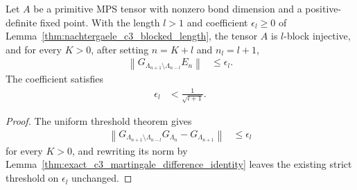 \begin{lemma}
    \label{thm:literal_open_chain_martingale_c3}
    \leanok
    Let $A$ be a primitive MPS tensor with nonzero bond dimension and a
    positive-definite fixed point.  With the length $l>1$ and coefficient
    $\epsilon_l\geq0$ of Lemma~\ref{thm:nachtergaele_c3_blocked_length}, the
    tensor $A$ is $l$-block injective, and for every $K>0$, after setting
    $n=K+l$ and $n_l=l+1$,
    \begin{align}
        \left\lVert
        G_{\Lambda_{n+1}\setminus\Lambda_{n-l}}E_n
        \right\rVert
         & \leq\epsilon_l.
        \label{eq:literal_open_chain_martingale_c3}
    \end{align}
    The coefficient satisfies
    \begin{align}
        \epsilon_l
         & <\frac{1}{\sqrt{l+1}}.
        \label{eq:literal_open_chain_martingale_c3_threshold}
    \end{align}
\end{lemma}

\begin{proof}
    \leanok
    The uniform threshold theorem gives
    \begin{align}
        \left\lVert
        G_{\Lambda_{n+1}\setminus\Lambda_{n-l}}G_{\Lambda_n}
        -G_{\Lambda_{n+1}}
        \right\rVert
         & \leq\epsilon_l
    \end{align}
    for every $K>0$, and rewriting its norm by
    Lemma~\ref{thm:exact_c3_martingale_difference_identity} leaves the
    existing strict threshold on $\epsilon_l$ unchanged.
\end{proof}

